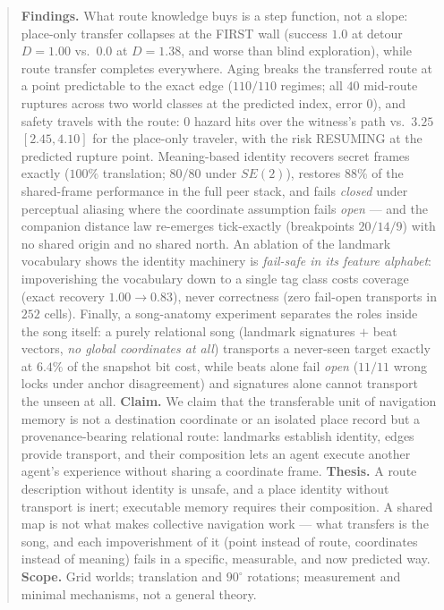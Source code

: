 \documentclass{article}
\begin{document}
\begin{abstract}
\textbf{Findings.} What route knowledge buys is a step function, not a slope: place-only transfer collapses at the FIRST wall (success $1.0$ at detour $D{=}1.00$ vs.\ $0.0$ at $D{=}1.38$, and worse than blind exploration), while route transfer completes everywhere. Aging breaks the transferred route at a point predictable to the exact edge ($110/110$ regimes; all $40$ mid-route ruptures across two world classes at the predicted index, error $0$), and safety travels with the route: $0$ hazard hits over the witness's path vs.\ $3.25$ $[2.45,4.10]$ for the place-only traveler, with the risk RESUMING at the predicted rupture point. Meaning-based identity recovers secret frames exactly ($100\%$ translation; $80/80$ under $SE(2)$), restores $88\%$ of the shared-frame performance in the full peer stack, and fails \emph{closed} under perceptual aliasing where the coordinate assumption fails \emph{open} --- and the companion distance law re-emerges tick-exactly (breakpoints $20/14/9$) with no shared origin and no shared north. An ablation of the landmark vocabulary shows the identity machinery is \emph{fail-safe in its feature alphabet}: impoverishing the vocabulary down to a single tag class costs coverage (exact recovery $1.00 \to 0.83$), never correctness (zero fail-open transports in $252$ cells). Finally, a song-anatomy experiment separates the roles inside the song itself: a purely relational song (landmark signatures $+$ beat vectors, \emph{no global coordinates at all}) transports a never-seen target exactly at $6.4\%$ of the snapshot bit cost, while beats alone fail \emph{open} ($11/11$ wrong locks under anchor disagreement) and signatures alone cannot transport the unseen at all.
\textbf{Claim.} We claim that the transferable unit of navigation memory is not a destination coordinate or an isolated place record but a provenance-bearing relational route: landmarks establish identity, edges provide transport, and their composition lets an agent execute another agent's experience without sharing a coordinate frame.
\textbf{Thesis.} A route description without identity is unsafe, and a place identity without transport is inert; executable memory requires their composition. A shared map is not what makes collective navigation work --- what transfers is the song, and each impoverishment of it (point instead of route, coordinates instead of meaning) fails in a specific, measurable, and now predicted way.
\textbf{Scope.} Grid worlds; translation and $90^\circ$ rotations; measurement and minimal mechanisms, not a general theory.
\end{abstract}
\end{document}
